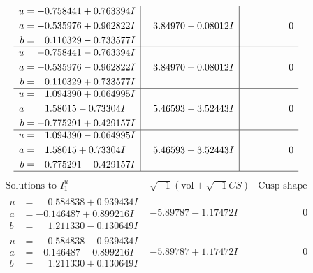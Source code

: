\documentclass[1p]{elsarticle_modified}
\theoremstyle{definition}
\newcommand{\I}{\sqrt{-1}}
\begin{document}
$$\begin{array}{c|c|c}
\begin{aligned}
u &= -0.758441 + 0.763394 I \\
a &= -0.535976 + 0.962822 I \\
b &= \phantom{-}0.110329 - 0.733577 I\end{aligned}
 & \phantom{-}3.84970 - 0.08012 I & \phantom{-0.000000 } 0 \\ \hline\begin{aligned}
u &= -0.758441 - 0.763394 I \\
a &= -0.535976 - 0.962822 I \\
b &= \phantom{-}0.110329 + 0.733577 I\end{aligned}
 & \phantom{-}3.84970 + 0.08012 I & \phantom{-0.000000 } 0 \\ \hline\begin{aligned}
u &= \phantom{-}1.094390 + 0.064995 I \\
a &= \phantom{-}1.58015 - 0.73304 I \\
b &= -0.775291 + 0.429157 I\end{aligned}
 & \phantom{-}5.46593 - 3.52443 I & \phantom{-0.000000 } 0 \\ \hline\begin{aligned}
u &= \phantom{-}1.094390 - 0.064995 I \\
a &= \phantom{-}1.58015 + 0.73304 I \\
b &= -0.775291 - 0.429157 I\end{aligned}
 & \phantom{-}5.46593 + 3.52443 I & \phantom{-0.000000 } 0\\
 \hline 
 \end{array}$$\newpage$$\begin{array}{c|c|c}  
\text{Solutions to }I^u_{1}& \I (\text{vol} + \sqrt{-1}CS) & \text{Cusp shape}\\
 \hline 
\begin{aligned}
u &= \phantom{-}0.584838 + 0.939434 I \\
a &= -0.146487 + 0.899216 I \\
b &= \phantom{-}1.211330 - 0.130649 I\end{aligned}
 & -5.89787 - 1.17472 I & \phantom{-0.000000 } 0 \\ \hline\begin{aligned}
u &= \phantom{-}0.584838 - 0.939434 I \\
a &= -0.146487 - 0.899216 I \\
b &= \phantom{-}1.211330 + 0.130649 I\end{aligned}
 & -5.89787 + 1.17472 I & \phantom{-0.000000 } 0 \\ \hline\begin{aligned}

\end{aligned}
\end{array}$$
\end{document}
